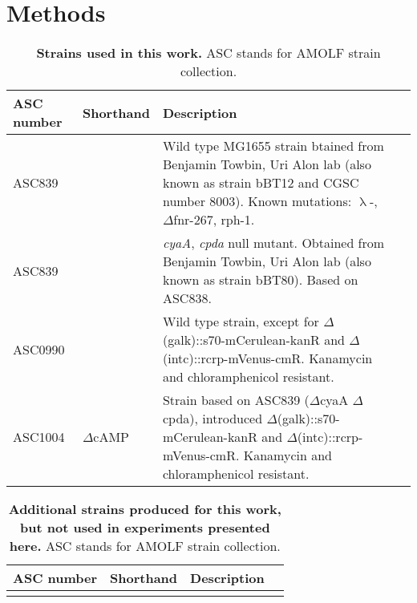 %
% 



\section*{Methods}



\begin{table}[h]
	\begin{tabularx}{\textwidth}{llXl}

	\textbf{ASC number}	& \textbf{Shorthand} & \textbf{Description}	\\
	\hline

	ASC839	& 				& Wild type MG1655 strain btained from Benjamin Towbin, Uri Alon lab (also known as strain bBT12 and CGSC number 8003). Known mutations: $\uplambda$-, 	$\Delta$fnr-267, rph-1. \cite{Towbin2017} \\
	ASC839	& 				& \textit{cyaA}, \textit{cpda} null mutant. Obtained from Benjamin Towbin, Uri Alon lab (also known as strain bBT80). Based on ASC838. \cite{Towbin2017} \\
	
	
	ASC0990  &  			& Wild type strain, except for $\Delta$(galk)::s70-mCerulean-kanR and $\Delta$(intc)::rcrp-mVenus-cmR. Kanamycin and chloramphenicol resistant. \\
	ASC1004  & $\Delta$cAMP & Strain based on ASC839 ($\Delta$cyaA $\Delta$cpda), introduced $\Delta$(galk)::s70-mCerulean-kanR and $\Delta$(intc)::rcrp-mVenus-cmR. Kanamycin and chloramphenicol resistant. \\
	
	\hline
	\end{tabularx}
	\caption{\textbf{Strains used in this work.} ASC stands for AMOLF strain collection.}
\end{table}

\begin{table}[h]
	\begin{tabularx}{\textwidth}{llXl}
		
		\textbf{ASC number}	& \textbf{Shorthand} & \textbf{Description}	\\
		\hline
				
		\red{XXX} & 				\red{XXX} & 				\red{XXX} \\
				
		\hline
	\end{tabularx}
	\caption{\textbf{Additional strains produced for this work, but not used in experiments presented here.} ASC stands for AMOLF strain collection.}
\end{table}

